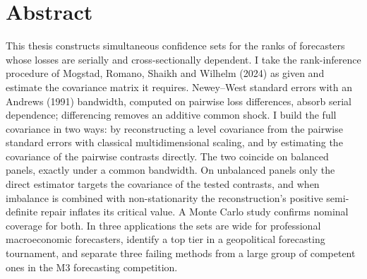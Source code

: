 \chapter*{Abstract}

This thesis constructs simultaneous confidence sets for the ranks of forecasters whose
losses are serially and cross-sectionally dependent. I take the rank-inference
procedure of Mogstad, Romano, Shaikh and Wilhelm (2024) as given and estimate the
covariance matrix it requires. Newey--West standard errors with an Andrews (1991)
bandwidth, computed on pairwise loss differences, absorb serial dependence; differencing
removes an additive common shock. I build the full covariance in two ways: by
reconstructing a level covariance from the pairwise standard errors with classical
multidimensional scaling, and by estimating the covariance of the pairwise contrasts
directly. The two coincide on balanced panels, exactly under a common bandwidth. On
unbalanced panels only the direct estimator targets the covariance of the tested
contrasts, and when imbalance is combined with non-stationarity the reconstruction's
positive semi-definite repair inflates its critical value. A Monte Carlo study confirms
nominal coverage for both. In three applications the sets are wide for professional
macroeconomic forecasters, identify a top tier in a geopolitical forecasting tournament,
and separate three failing methods from a large group of competent ones in the M3
forecasting competition.
